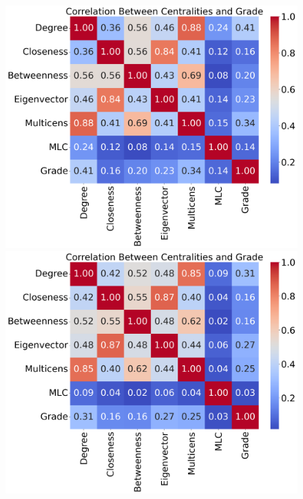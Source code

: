 \documentclass[10pt,letterpaper]{article}
\begin{document}
\begin{figure}[h!]
\begin{minipage}[b]{0.28\linewidth}
	\centering
	\includegraphics[width=\textwidth]{figs/fig34-npas2_bmal1-corr.png}
	\subcaption{}
\end{minipage}
\hspace{0.5cm}
\begin{minipage}[b]{0.28\linewidth}
	\centering
	\includegraphics[width=\textwidth]{figs/fig35-npas3_arnt-corr.png}
	\subcaption{}
\end{minipage}
\hspace{0.5cm}

\end{figure}
\end{document}
